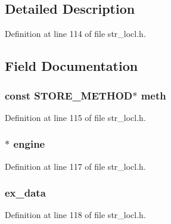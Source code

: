 \subsection{Detailed Description}


Definition at line 114 of file str\+\_\+locl.\+h.



\subsection{Field Documentation}
\subsubsection[{\texorpdfstring{meth}{meth}}]{\setlength{\rightskip}{0pt plus 5cm}const {\bf S\+T\+O\+R\+E\+\_\+\+M\+E\+T\+H\+OD}$\ast$ meth}\hypertarget{structstore__st_ae284fdb2c7bd469db381812a348e31bf}{}\label{structstore__st_ae284fdb2c7bd469db381812a348e31bf}


Definition at line 115 of file str\+\_\+locl.\+h.

\subsubsection[{\texorpdfstring{engine}{engine}}]{$\ast$ engine}\hypertarget{structstore__st_a4eb35fa252ec72ad7c53a4c8d30a7fd3}{}\label{structstore__st_a4eb35fa252ec72ad7c53a4c8d30a7fd3}


Definition at line 117 of file str\+\_\+locl.\+h.

\subsubsection[{\texorpdfstring{ex\+\_\+data}{ex_data}}]{ ex\+\_\+data}\hypertarget{structstore__st_ac3e4fd59d6ee44a81f3a58114613c1e2}{}\label{structstore__st_ac3e4fd59d6ee44a81f3a58114613c1e2}


Definition at line 118 of file str\+\_\+locl.\+h.

